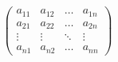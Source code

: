 \documentclass{article}
\begin{document}
\vspace*{\fill} \vspace*{-5ex}
$$
\begin{pmatrix}
a_{11}& a_{12} &\ldots & a_{1n}\\
a_{21}& a_{22} &\ldots & a_{2n}\\
\vdots& \vdots &\ddots & \vdots\\
a_{n1}& a_{n2} &\ldots & a_{nn}
\end{pmatrix}
$$

\vspace*{\fill}
\end{document}
